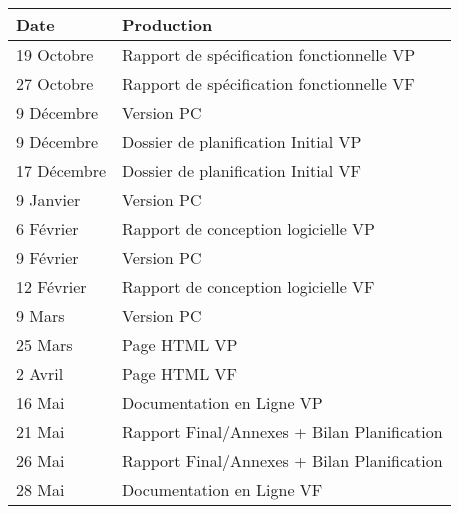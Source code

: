 \begin{tabular}{|l|l|}
\hline
  Date &
  Production \\
\hline
  19 Octobre &
  Rapport de spécification fonctionnelle VP \\
\hline
  27 Octobre &
  Rapport de spécification fonctionnelle VF \\
\hline
  9 Décembre &
  Version PC \textnumero1 \\
\hline
  9 Décembre &
  Dossier de planification Initial VP \\
\hline
  17 Décembre &
  Dossier de planification Initial VF \\
\hline
  9 Janvier &
  Version PC \textnumero2 \\
\hline
  6 Février &
  Rapport de conception logicielle VP \\
\hline
  9 Février &
  Version PC \textnumero3 \\
\hline
  12 Février &
  Rapport de conception logicielle VF \\
\hline
  9 Mars &
  Version PC \textnumero4 \\
\hline
  25 Mars &
  Page HTML VP \\
\hline
  2 Avril &
  Page HTML VF \\
\hline
  16 Mai &
  Documentation en Ligne VP \\
\hline
  21 Mai &
  Rapport Final/Annexes + Bilan Planification \\
\hline
  26 Mai &
  Rapport Final/Annexes + Bilan Planification \\
\hline
  28 Mai &
  Documentation en Ligne VF \\
\hline
\end{tabular}

